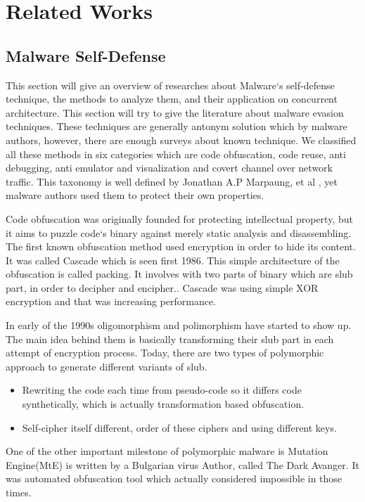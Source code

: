 
\chapter{Related Works}
\section{Malware Self-Defense}
This section will give an overview of researches about Malware`s self-defense technique, the methods to analyze them, and their application on concurrent architecture. 
This section will try to give the literature about malware evasion techniques. These techniques are generally antonym solution which  by malware authors, however, there are enough surveys about known technique. We classified all these methods in six categories which are code obfuscation, code reuse, anti debugging, anti emulator and visualization and covert channel over network traffic. This taxonomy is well defined by Jonathan A.P Marpaung, et al \cite{marpaung2012survey}, yet malware authors used them to protect their own properties. 


Code obfuscation was originally founded for protecting intellectual property\cite{balakrishnan2005code}, but it aims to puzzle code`s binary against merely static analysis and disassembling\cite{nachenberg1996understanding}. The first known obfuscation method used encryption in order to hide its content. It was called Cascade which is seen first 1986\cite{you2010malware}. This simple architecture of the obfuscation is called packing\cite{internotsecurityteam}. It involves with two parts of binary which are slub part, in order to decipher and encipher.\cite{marpaung2012survey}. Cascade was using simple XOR encryption and that was increasing performance.

In early of the 1990s oligomorphism and polimorphism have started to show up\cite{you2010malware}. The main idea behind them is basically transforming their slub part in each attempt of encryption process\cite{nachenberg1996understanding}. Today, there are two types of  polymorphic approach to generate different variants of slub.\cite{li2011mechanisms}
\begin{itemize}
  \item Rewriting the code each time from pseudo-code so it differs code synthetically, which is actually transformation based obfuscation.
  \item Self-cipher itself different, order of these ciphers and using different keys.
\end{itemize}
One of the other important milestone of polymorphic malware is Mutation Engine(MtE) is written by a Bulgarian virus Author, called The Dark Avanger. It was automated obfuscation tool which actually considered impossible in those times.\cite{anonymous1}

